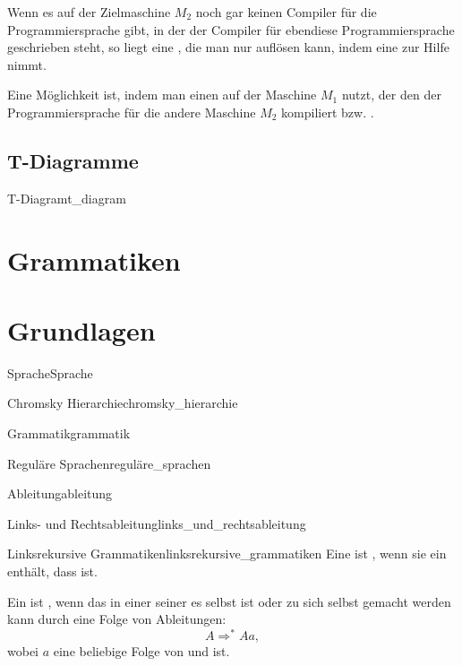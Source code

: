   Wenn es auf der Zielmaschine $M_2$ noch gar keinen Compiler für die Programmiersprache gibt, in der der Compiler für ebendiese Programmiersprache geschrieben steht, so liegt eine , die man nur auflösen kann, indem eine  zur Hilfe nimmt.

  Eine Möglichkeit ist, indem man einen  auf der Maschine $M_1$ nutzt, der den  der Programmiersprache für die andere Maschine $M_2$ kompiliert bzw. .


\subsection{T-Diagramme}
\begin{Definition}{T-Diagram}{t_diagram}
\end{Definition}
\section{Grammatiken}
\section{Grundlagen}
\begin{Definition}{Sprache}{Sprache}
\end{Definition}
\begin{Definition}{Chromsky Hierarchie}{chromsky_hierarchie}
\end{Definition}
\begin{Definition}{Grammatik}{grammatik}
\end{Definition}
\begin{Definition}{Reguläre Sprachen}{reguläre_sprachen}
\end{Definition}
\begin{Definition}{Ableitung}{ableitung}
\end{Definition}
\begin{Definition}{Links- und Rechtsableitung}{links_und_rechtsableitung}
\end{Definition}
\begin{Definition}{Linksrekursive Grammatiken}{linksrekursive_grammatiken}
Eine  ist , wenn sie ein   enthält, dass  ist.

Ein  ist  , wenn das  in einer seiner  es selbst ist oder zu sich selbst gemacht werden kann durch eine Folge von Ableitungen:
\begin{equation*}
  A \Rightarrow^{*} Aa,
\end{equation*}
wobei $a$ eine beliebige Folge von  und  ist.
\end{Definition}
